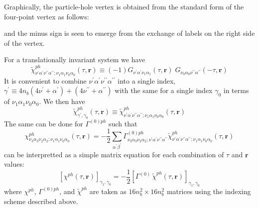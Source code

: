 Graphically, the particle-hole vertex is obtained from
the standard form of the four-point vertex 
as follows:
\begin{center}
\end{center}
and the minus sign is seen to emerge from the exchange of labels
on the right side of the vertex.

For a translationally invariant system we have
\begin{equation}
\tilde{\chi}^{ph}_{\nu^{\prime}\alpha^{\prime}\nu^{\prime\prime}\alpha^{\prime\prime}; 
\nu_1\alpha_1 \nu_0\alpha_0}(\tau,\mathbf{r}) \equiv
(-1) G_{\nu^{\prime}\alpha^{\prime}\nu_1 \alpha_1}(\tau,\mathbf{r}) \; 
G_{\nu_0\alpha_0 \nu^{\prime\prime}\alpha^{\prime\prime}}(-\tau,\mathbf{r})
\end{equation}
It is convenient to combine $\nu^{\prime}\alpha^{\prime}\nu^{\prime\prime}
\alpha^{\prime\prime}$
into a single index, $\gamma^{\prime} \equiv
4 n_b(4\nu^{\prime}+ \alpha^{\prime}) + (4\nu^{\prime\prime} + 
\alpha^{\prime\prime})$ with the same
for a single index $\gamma_0$ in
terms of $\nu_1\alpha_1\nu_0\alpha_0$.  We then have
\begin{equation}
\tilde{\chi}^{ph}_{\gamma^{\prime},\gamma_0}(\tau,\mathbf{r}) \equiv
\tilde{\chi}^{ph}_{\nu^{\prime}\alpha^{\prime}\nu^{\prime\prime}\alpha^{\prime\prime}; 
\nu_1\alpha_1 \nu_0\alpha_0}(\tau,\mathbf{r})
\end{equation}
The same can be done for $\Gamma^{(0)ph}$ such that
\begin{equation}
\chi^{ph}_{\nu_3\alpha_3\nu_2\alpha_2;\nu_1\alpha_1\nu_0\alpha_0}(\tau,\mathbf{r}) 
=-\frac{1}{2} \sum_{\alpha^{\prime}\beta^{\prime}} 
\Gamma^{(0)ph}_{\nu_3\alpha_3\nu_2\alpha_2;\nu^{\prime}\alpha^{\prime}
\nu^{\prime\prime}\alpha^{\prime\prime}}
\tilde{\chi}^{ph}_{\nu^{\prime}\alpha^{\prime}\nu^{\prime\prime}\alpha^{\prime\prime};
\nu_1\alpha_1\nu_0\alpha_0}
(\tau,\mathbf{r})
\end{equation}
can be interpretted as a simple matrix equation for each combination
of $\tau$ and $\mathbf{r}$ values:
\begin{equation}
\left[\chi^{ph}(\tau,\mathbf{r})\right]_{\gamma_1,\gamma_0} =
-\frac{1}{2}
\left[\Gamma^{(0)}\,\tilde{\chi}^{ph}(\tau,\mathbf{r})\right]_{\gamma_1,\gamma_0}
\end{equation}
where $\chi^{ph}$, $\Gamma^{(0)ph}$, and $\tilde{\chi}^{ph}$
are taken as $16n_b^2 \times 16n_b^2$ matrices using the indexing scheme
described above.

